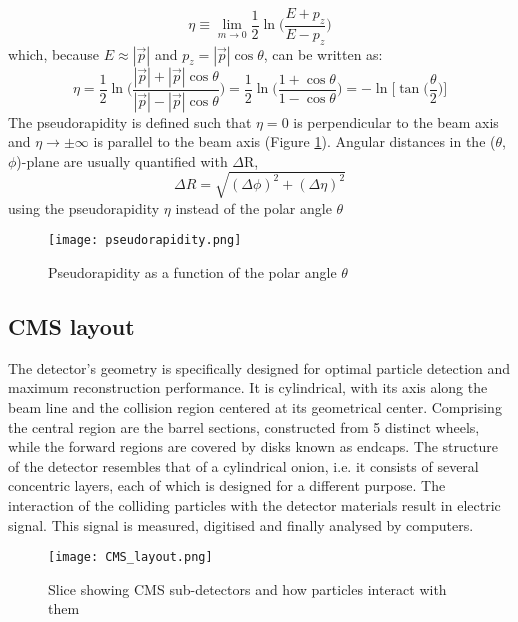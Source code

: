 \begin{equation}
    \eta \equiv \lim_{m \rightarrow 0} \frac{1}{2} \ln\bigg( \frac{E+p_z}{E-p_z}\bigg)
\end{equation}
which, because $E \approx |\vec{p}|$ and $p_z = |\vec{p}| \cos\theta$, can be written as:
\begin{equation}
    \eta = \frac{1}{2} \ln\bigg( \frac{ |\vec{p}| +|\vec{p}|\cos\theta}{|\vec{p}|- |\vec{p}| \cos\theta}\bigg) = \frac{1}{2} \ln\bigg( \frac{ 1 +\cos\theta}{1 - \cos\theta}\bigg) = -\ln\bigg[ \tan\bigg( \frac{\theta}{2} \bigg) \bigg]
\end{equation}
The pseudorapidity is defined such that $\eta = 0$  is perpendicular to the beam axis and $\eta \rightarrow \pm \infty$ is parallel to the beam axis (Figure \ref{fig:pseudorapidity}). Angular distances in the ($\theta$, $\phi$)-plane are usually quantified with $\Delta$R,
 \begin{equation}
     \Delta R= \sqrt{(\Delta\phi)^2 + (\Delta\eta)^2}
 \end{equation}
using the pseudorapidity $\eta$ instead of the polar angle $\theta$
\begin{figure}[H]
    \centering
    \texttt{[image: pseudorapidity.png]}
    \caption{Pseudorapidity as a function of the polar angle $\theta$ \cite{Schwartz_2018}}
    \label{fig:pseudorapidity}
\end{figure}

\subsection{\label{sec:exp_CMS_layout}CMS layout}
\noindent The detector's geometry is specifically designed for optimal particle detection and maximum reconstruction performance. It is cylindrical, with its axis along the beam line and the collision region centered at its geometrical center. Comprising the central region are the barrel sections, constructed from 5 distinct wheels, while the forward regions are covered by disks known as endcaps. The structure of the detector resembles that of a cylindrical onion, i.e. it consists of several concentric layers, each of which is designed for a different purpose. The interaction of the colliding particles with the detector materials result in electric signal. This signal is measured, digitised and finally analysed by computers.

\begin{figure}[H]
    \centering
    \texttt{[image: CMS\_layout.png]}
    \caption{Slice showing CMS sub-detectors and how particles interact with them \cite{CMS_slice}}
    \label{fig:CMS_slice}
\end{figure}

